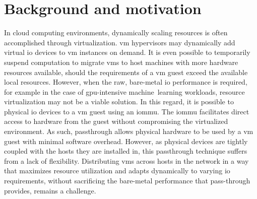 \section{Background and motivation}\label{sec:motivation}
In cloud computing environments, dynamically scaling resources is often accomplished through virtualization. 
%
\Gls{vm} \glspl{hypervisor} may dynamically add virtual \gls{io} devices to \gls{vm} instances on demand.
%
It is even possible to temporarily suspend computation to migrate \glspl{vm} to \gls{host} machines with more hardware resources available, should the requirements of a \gls{vm} \gls{guest} exceed the available local resources.
%
However, when the raw, bare-metal \gls{io} performance is required, for example in the case of \gls{gpu}-intensive machine~learning workloads, resource virtualization may not be a viable solution.
%
In this regard, it is possible to  physical \gls{io} devices to a \gls{vm} \gls{guest} using an \gls{iommu}.
%
The \gls{iommu} facilitates direct access to hardware from the \gls{guest} without compromising the virtualized environment.
%
As such, \gls{passthrough} allows physical hardware to be used by a \gls{vm} \gls{guest} with minimal software overhead.
%
However, as physical devices are tightly coupled with the hosts they are installed in, this \gls{passthrough} technique suffers from a lack of flexibility.
%
Distributing \glspl{vm} across hosts in the network in a way that maximizes resource utilization and adapts dynamically to varying \gls{io} requirements, without sacrificing the bare-metal performance that pass-through provides, remains a challenge.



